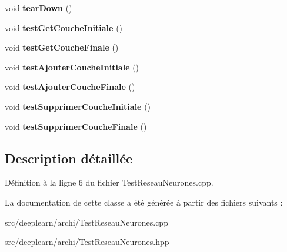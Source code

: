 \begin{DoxyCompactItemize}
void {\bfseries tear\+Down} ()
\item 
\mbox{\label{class_test_reseau_neurones_aaf72a0dbcbb46dbdbfb36fe61514d59d}} 
void {\bfseries test\+Get\+Couche\+Initiale} ()
\item 
\mbox{\label{class_test_reseau_neurones_a9808a8c9c28f167845db1e6f57435bb3}} 
void {\bfseries test\+Get\+Couche\+Finale} ()
\item 
\mbox{\label{class_test_reseau_neurones_a2aa4cdb205ead6f6275db97894c1be09}} 
void {\bfseries test\+Ajouter\+Couche\+Initiale} ()
\item 
\mbox{\label{class_test_reseau_neurones_a2cc008d42aff3d270ae3e1f935fbf6b8}} 
void {\bfseries test\+Ajouter\+Couche\+Finale} ()
\item 
\mbox{\label{class_test_reseau_neurones_a289a476c4f62458cb9ded841ea1b4148}} 
void {\bfseries test\+Supprimer\+Couche\+Initiale} ()
\item 
\mbox{\label{class_test_reseau_neurones_a0e733607d7e5bbd48a3d6e5b62d5991f}} 
void {\bfseries test\+Supprimer\+Couche\+Finale} ()
\end{DoxyCompactItemize}


\subsection{Description détaillée}


Définition à la ligne 6 du fichier Test\+Reseau\+Neurones.\+cpp.



La documentation de cette classe a été générée à partir des fichiers suivants \+:\begin{DoxyCompactItemize}
\item 
src/deeplearn/archi/Test\+Reseau\+Neurones.\+cpp\item 
src/deeplearn/archi/Test\+Reseau\+Neurones.\+hpp\end{DoxyCompactItemize}
